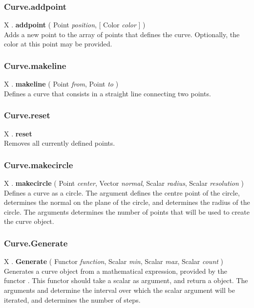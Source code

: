 \subsubsection{Curve.addpoint \label{F:Curve:addpoint}}
X . \textbf{addpoint} ( Point \textit{position},  [ Color \textit{color} ] ) \\
Adds a new point to the array of points that defines the curve. Optionally, the color at this point may be provided.

\subsubsection{Curve.makeline \label{F:Curve:makeline}}
X . \textbf{makeline} ( Point \textit{from}, Point \textit{to} ) \\
Defines a curve that consists in a straight line connecting two points.

\subsubsection{Curve.reset \label{F:Curve:reset}}
X . \textbf{reset} \\
Removes all currently defined points.

\subsubsection{Curve.makecircle \label{F:Curve:makecircle}}
X . \textbf{makecircle} ( Point \textit{center}, Vector \textit{normal}, Scalar \textit{radius}, Scalar \textit{resolution} ) \\
Defines a curve as a circle. The argument  defines the centre point of the circle,  determines the normal on the plane of the circle, and  determines the radius of the circle. The arguments  determines the number of points that will be used to create the curve object.

\subsubsection{Curve.Generate \label{F:Curve:Generate}}
X . \textbf{Generate} ( Functor \textit{function}, Scalar \textit{min}, Scalar \textit{max}, Scalar \textit{count} ) \\
Generates a curve object from a mathematical expression, provided by the functor . This functor should take a scalar as argument, and return a  object. The arguments  and  determine the interval over which the scalar argument will be iterated, and  determines the number of steps.

